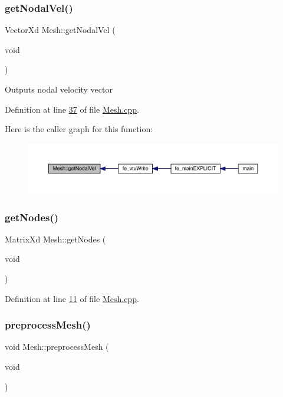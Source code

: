 \subsubsection{\texorpdfstring{get\+Nodal\+Vel()}{getNodalVel()}}
{\footnotesize\ttfamily Vector\+Xd Mesh\+::get\+Nodal\+Vel (\begin{DoxyParamCaption}\item[{void}]{ }\end{DoxyParamCaption})}

Outputs nodal velocity vector 

Definition at line \hyperlink{_mesh_8cpp_source_l00037}{37} of file \hyperlink{_mesh_8cpp_source}{Mesh.\+cpp}.

Here is the caller graph for this function\+:\nopagebreak
\begin{figure}[H]
\begin{center}
\leavevmode
\includegraphics[width=350pt]{class_mesh_a052cd330cb8ccecf63e960a7afd0a6d9_icgraph}
\end{center}
\end{figure}
\mbox{\label{class_mesh_a0b0f7458f07745240d9bda967cda12de}} 
\subsubsection{\texorpdfstring{get\+Nodes()}{getNodes()}}
{\footnotesize\ttfamily Matrix\+Xd Mesh\+::get\+Nodes (\begin{DoxyParamCaption}\item[{void}]{ }\end{DoxyParamCaption})}



Definition at line \hyperlink{_mesh_8cpp_source_l00011}{11} of file \hyperlink{_mesh_8cpp_source}{Mesh.\+cpp}.

\mbox{\label{class_mesh_aa8a6f260e9589be4c0a2fcc146e696d5}} 
\subsubsection{\texorpdfstring{preprocess\+Mesh()}{preprocessMesh()}}
{\footnotesize\ttfamily void Mesh\+::preprocess\+Mesh (\begin{DoxyParamCaption}\item[{void}]{ }\end{DoxyParamCaption})}

